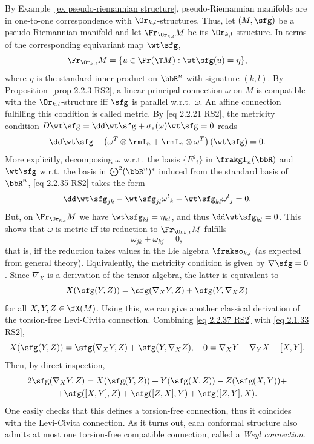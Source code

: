 \begin{example}
    By Example~\ref{ex pseudo-riemannian structure}, pseudo-Riemannian manifolds are in one-to-one correspondence with $\Or_{k,l}$-structures. Thus, let $(M,\sfg)$ be a pseudo-Riemannian manifold and let $\Fr_{\Or_{k,l}} M$ be its $\Or_{k,l}$-structure. In terms of the corresponding equivariant map $\wt\sfg$, 
    \[\Fr_{\Or_{k,l}}M=\{u \in\Fr(\T M):\wt\sfg(u)=\eta\},\]
    where $\eta$ is the standard inner product on $\bbR^n$ with signature $(k,l)$. By Proposition~\ref{prop 2.2.3 RS2}, a linear principal connection $\omega$ on $M$ is compatible with the $\Or_{k,l}$-structure iff $\sfg$ is parallel w.r.t.\ $\omega$. An affine connection fulfilling this condition is called metric. By \eqref{eq 2.2.21 RS2}, the metricity condition $D\wt\sfg=\dd\wt\sfg+\sigma_\ast(\omega)\wt\sfg=0$ reads 
    \[\dd\wt\sfg-\left(\omega^T\otimes \rmI_n+\rmI_n\otimes \omega^T\right)(\wt\sfg)=0.\label{eq 2.2.35 RS2}\]
    More explicitly, decomposing $\omega$ w.r.t.\ the basis $\{E^j{}_i\}$ in $\frakgl_n(\bbR)$ and $\wt\sfg$ w.r.t.\ the basis in $\bigodot^2(\bbR^n)^\ast$ induced from the standard basis of $\bbR^n$, \eqref{eq 2.2.35 RS2} takes the form 
    \[\dd \wt\sfg_{jk}-\wt\sfg_{jl}\omega^l{}_k-\wt\sfg_{kl}\omega^l{}_j=0.\]
    But, on $\Fr_{\Or_{k,l}} M$ we have $\wt\sfg_{kl}=\eta_{kl}$, and thus $\dd\wt\sfg_{kl}=0$. This shows that $\omega$ is metric iff its reduction to $\Fr_{\Or_{k,l}}M$ fulfills 
    \[\omega_{jk}+\omega_{kj}=0,\]
    that is, iff the reduction takes values in the Lie algebra $\frakso_{k,l}$ (as expected from general theory). Equivalently, the metricity condition is given by $\nabla\sfg=0$. Since $\nabla_X$ is a derivation of the tensor algebra, the latter is equivalent to 
    \[X(\sfg(Y,Z))=\sfg(\nabla_X Y,Z)+\sfg(Y,\nabla_X Z)\label{eq 2.2.37 RS2}\]
    for all $X,Y,Z\in\fX(M)$. Using this, we can give another classical derivation of the torsion-free Levi-Civita connection. Combining \eqref{eq 2.2.37 RS2} with \eqref{eq 2.1.33 RS2}, 
    \[X(\sfg(Y,Z))=\sfg(\nabla_X Y,Z)+\sfg(Y,\nabla_X Z),\quad 0=\nabla_X Y-\nabla_Y X-[X,Y].\]
    Then, by direct inspection,
    \begin{multline}
        2\sfg(\nabla_X Y,Z)=X(\sfg(Y,Z))+Y(\sfg(X,Z))-Z(\sfg(X,Y))+\\
        +\sfg([X,Y],Z)+\sfg([Z,X],Y)+\sfg([Z,Y],X).\label{eq 2.2.40 RS2}
    \end{multline}
    One easily checks that this defines a torsion-free connection, thus it coincides with the Levi-Civita connection.  As it turns out, each conformal structure also admits at most one torsion-free compatible connection, called a \emph{Weyl connection}.
\end{example}


